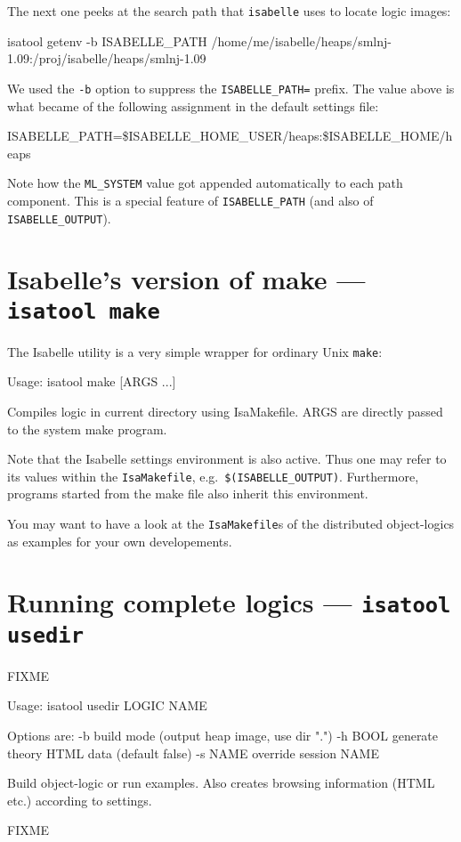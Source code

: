 The next one peeks at the search path that \texttt{isabelle} uses to
locate logic images:
\begin{ttbox}
isatool getenv -b ISABELLE_PATH
{\out /home/me/isabelle/heaps/smlnj-1.09:/proj/isabelle/heaps/smlnj-1.09}
\end{ttbox}
We used the \texttt{-b} option to suppress the \texttt{ISABELLE_PATH=}
prefix.  The value above is what became of the following assignment in
the default settings file:
\begin{ttbox}
ISABELLE_PATH=\$ISABELLE_HOME_USER/heaps:\$ISABELLE_HOME/heaps
\end{ttbox}
Note how the \texttt{ML_SYSTEM} value got appended automatically to
each path component. This is a special feature of
\texttt{ISABELLE_PATH} (and also of \texttt{ISABELLE_OUTPUT}).


\section{Isabelle's version of make --- \texttt{isatool make}}

The Isabelle  utility is a very simple wrapper for
ordinary Unix \texttt{make}:
\begin{ttbox}
Usage: isatool make [ARGS ...]

  Compiles logic in current directory using IsaMakefile.
  ARGS are directly passed to the system make program.
\end{ttbox}
Note that the Isabelle settings environment is also active. Thus one
may refer to its values within the \texttt{IsaMakefile}, e.g.\ 
\texttt{\$(ISABELLE_OUTPUT)}. Furthermore, programs started from the
make file also inherit this environment.

\medskip You may want to have a look at the \texttt{IsaMakefile}s of
the distributed object-logics as examples for your own developements.


\section{Running complete logics --- \texttt{isatool usedir}} \label{sec:tool-usedir}

FIXME

\begin{ttbox}
Usage: isatool usedir LOGIC NAME

  Options are:
    -b           build mode (output heap image, use dir ".")
    -h BOOL      generate theory HTML data (default false)
    -s NAME      override session NAME

  Build object-logic or run examples. Also creates browsing
  information (HTML etc.) according to settings.
\end{ttbox}

FIXME

